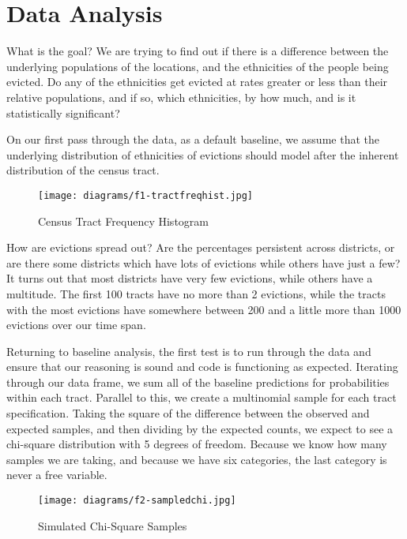 \chapter{Data Analysis}
\label{chap:dataanalysis}
What is the goal?  We are trying to find out if there is a difference between the underlying populations of the locations, and the ethnicities of the people being evicted.  Do any of the ethnicities get evicted at rates greater or less than their relative populations, and if so, which ethnicities, by how much, and is it statistically significant?

\par On our first pass through the data, as a default baseline, we assume that the underlying distribution of ethnicities of evictions should model after the inherent distribution of the census tract.

\begin{wrapfigure}{r}{2in}
\texttt{[image: diagrams/f1-tractfreqhist.jpg]}
\caption{Census Tract Frequency Histogram}
\label{fig:figure1}
\end{wrapfigure}

How are evictions spread out?  Are the percentages persistent across districts, or are there some districts which have lots of evictions while others have just a few? It turns out that most districts have very few evictions, while others have a multitude.  The first 100 tracts have no more than 2 evictions, while the tracts with the most evictions have somewhere between 200 and a little more than 1000 evictions over our time span.

\par Returning to baseline analysis, the first test is to run through the data and ensure that our reasoning is sound and code is functioning as expected.  Iterating through our data frame, we sum all of the baseline predictions for probabilities within each tract.  Parallel to this, we create a multinomial sample for each tract specification.  Taking the square of the difference between the observed and expected samples, and then dividing by the expected counts, we expect to see a chi-square distribution with 5 degrees of freedom.  Because we know how many samples we are taking, and because we have six categories, the last category is never a free variable.

\begin{wrapfigure}{r}{2in}
\texttt{[image: diagrams/f2-sampledchi.jpg]}
\caption{Simulated Chi-Square Samples}
\label{fig:figure2}
\end{wrapfigure}

